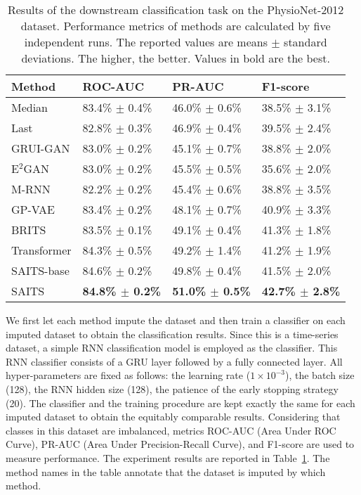\documentclass{article}
\begin{document}
\begin{table}[!htb]
	\caption{Results of the downstream classification task on the PhysioNet-2012 dataset. Performance metrics of methods are calculated by five independent runs. The reported values are means $\pm$ standard deviations. The higher, the better. Values in bold are the best.}
	\label{tb3}
	\centering
	\begin{tabular}{p{70pt}<{\centering}|p{90pt}<{\centering}|p{90pt}<{\centering}|p{90pt}<{\centering}}
		\toprule
		Method     & ROC-AUC           & PR-AUC              & F1-score              \\
		\midrule
		Median     & 83.4\% $\pm$ 0.4\% & 46.0\% $\pm$ 0.6\%  & 38.5\% $\pm$ 3.1\%  \\
		\midrule
		Last       & 82.8\% $\pm$ 0.3\% & 46.9\% $\pm$ 0.4\%  & 39.5\% $\pm$ 2.4\%  \\
		\midrule
		GRUI-GAN   & 83.0\% $\pm$ 0.2\% & 45.1\% $\pm$ 0.7\%  & 38.8\% $\pm$ 2.0\% \\
		\midrule
		E$^2$GAN   & 83.0\% $\pm$ 0.2\% & 45.5\% $\pm$ 0.5\%  & 35.6\% $\pm$ 2.0\%  \\
		\midrule
		M-RNN      & 82.2\% $\pm$ 0.2\% & 45.4\% $\pm$ 0.6\%  & 38.8\% $\pm$ 3.5\% \\
		\midrule
		GP-VAE     & 83.4\% $\pm$ 0.2\% & 48.1\% $\pm$ 0.7\%  & 40.9\% $\pm$ 3.3\% \\
		\midrule
		BRITS      & 83.5\% $\pm$ 0.1\% & 49.1\% $\pm$ 0.4\%  & 41.3\% $\pm$ 1.8\% \\
		\midrule
		Transformer& 84.3\% $\pm$ 0.5\% & 49.2\% $\pm$ 1.4\%  & 41.2\% $\pm$ 1.9\% \\
		\midrule
		SAITS-base& 84.6\% $\pm$ 0.2\% & 49.8\% $\pm$ 0.4\% & 41.5\% $\pm$ 2.0\%\vspace{0.5em} \\ 
		SAITS      & \textbf{84.8\% $\pm$ 0.2\%} & \textbf{51.0\% $\pm$ 0.5\%}  & \textbf{42.7\% $\pm$ 2.8\%} \\
		\bottomrule
	\end{tabular}
\end{table}

We first let each method impute the dataset and then train a classifier on each imputed dataset to obtain the classification results. Since this is a time-series dataset, a simple RNN classification model is employed as the classifier. This RNN classifier consists of a GRU layer followed by a fully connected layer. All hyper-parameters are fixed as follows: the learning rate ($1 \times 10^{-3}$), the batch size (128), the RNN hidden size (128), the patience of the early stopping strategy (20). The classifier and the training procedure are kept exactly the same for each imputed dataset to obtain the equitably comparable results. Considering that classes in this dataset are imbalanced, metrics ROC-AUC (Area Under ROC Curve), PR-AUC (Area Under Precision-Recall Curve), and F1-score are used to measure performance. The experiment results are reported in Table~\ref{tb3}. The method names in the table annotate that the dataset is imputed by which method. 
\end{document}
